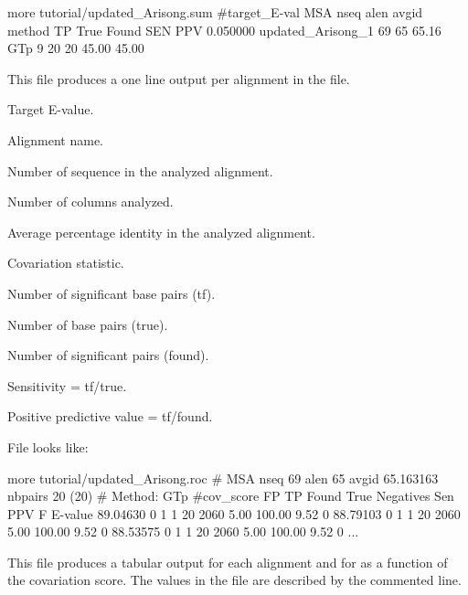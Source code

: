  \begin{sreoutput}
 more tutorial/updated_Arisong.sum 
 #target_E-val   MSA                     nseq    alen    avgid    method  TP      True    Found   SEN     PPV
 0.050000        updated_Arisong_1       69      65      65.16    GTp     9       20      20      45.00   45.00 
 \end{sreoutput}
 This file produces a one line output per alignment in the file.
 \begin{sreitems}{}
 \item[\prog{Column 1}] Target E-value.
 \item[\prog{Column 2}] Alignment name.
 \item[\prog{Column 3}] Number of sequence in the analyzed alignment.
 \item[\prog{Column 4}] Number of columns analyzed.
 \item[\prog{Column 5}] Average percentage identity in the analyzed alignment.
 \item[\prog{Column 6}] Covariation statistic.
 \item[\prog{Column 7}] Number of significant base pairs (tf).
 \item[\prog{Column 8}] Number of base pairs (true).
 \item[\prog{Column 9}] Number of significant pairs (found).
 \item[\prog{Column 10}] Sensitivity = tf/true.
 \item[\prog{Column 11}] Positive predictive value = tf/found.

 \end{sreitems}

 File  looks like:
 \begin{sreoutput}
 more tutorial/updated_Arisong.roc
# MSA nseq 69 alen 65 avgid 65.163163 nbpairs 20 (20)
# Method: GTp
#cov_score  FP  TP  Found  True  Negatives   Sen   PPV     F       E-value
89.04630    0   1       1    20       2060   5.00  100.00  9.52    0
88.79103    0   1       1    20       2060   5.00  100.00  9.52    0
88.53575    0   1       1    20       2060   5.00  100.00  9.52    0
...
\end{sreoutput}

This file produces a tabular output for each alignment and for as a
function of the covariation score. The values in the file are
described by the commented line.
